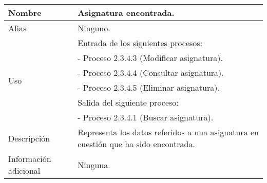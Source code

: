 \begin{center}
  \begin{tabular}{| l | p{9cm} |}
    \hline
    Nombre & \textbf{Asignatura encontrada}.\\
    \hline
    Alias & Ninguno.\\
    \hline
    \multirow{6}{*}{Uso} & Entrada de los siguientes procesos:\\
                         & - Proceso 2.3.4.3 (Modificar asignatura).\\
                         & - Proceso 2.3.4.4 (Consultar asignatura).\\
                         & - Proceso 2.3.4.5 (Eliminar asignatura).\\
                         & Salida del siguiente proceso:\\
                         & - Proceso 2.3.4.1 (Buscar asignatura).\\
    \hline
    Descripción & Representa los datos referidos a una asignatura en cuestión
                  que ha sido encontrada.\\
    \hline
    Información adicional & Ninguna.\\
    \hline
  \end{tabular}
\end{center}

